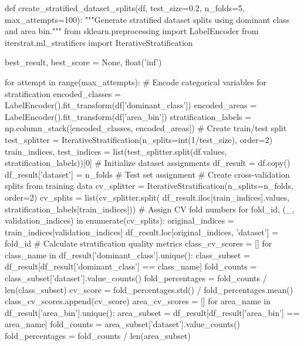 \newpage
\begin{code}[H]
    \begin{pythoncode}
    def create_stratified_dataset_splits(df, test_size=0.2, n_folds=5, max_attempts=100):
        """Generate stratified dataset splits using dominant class and area bin."""
        from sklearn.preprocessing import LabelEncoder
        from iterstrat.ml_stratifiers import IterativeStratification
        
        best_result, best_score = None, float('inf')
        
        for attempt in range(max_attempts):
            # Encode categorical variables for stratification
            encoded_classes = LabelEncoder().fit_transform(df['dominant_class'])
            encoded_areas = LabelEncoder().fit_transform(df['area_bin'])
            stratification_labels = np.column_stack([encoded_classes, encoded_areas])
            # Create train/test split
            test_splitter = IterativeStratification(n_splits=int(1/test_size), order=2)
            train_indices, test_indices = list(test_splitter.split(df.values, stratification_labels))[0]
            # Initialize dataset assignments
            df_result = df.copy()
            df_result['dataset'] = n_folds  # Test set assignment
            # Create cross-validation splits from training data
            cv_splitter = IterativeStratification(n_splits=n_folds, order=2)
            cv_splits = list(cv_splitter.split(
                df_result.iloc[train_indices].values, 
                stratification_labels[train_indices]))
            # Assign CV fold numbers
            for fold_id, (_, validation_indices) in enumerate(cv_splits):
                original_indices = train_indices[validation_indices]
                df_result.loc[original_indices, 'dataset'] = fold_id
            # Calculate stratification quality metrics
            class_cv_scores = []
            for class_name in df_result['dominant_class'].unique():
                class_subset = df_result[df_result['dominant_class'] == class_name]
                fold_counts = class_subset['dataset'].value_counts()
                fold_percentages = fold_counts / len(class_subset)
                cv_score = fold_percentages.std() / fold_percentages.mean()
                class_cv_scores.append(cv_score)
            area_cv_scores = []
            for area_name in df_result['area_bin'].unique():
                area_subset = df_result[df_result['area_bin'] == area_name]
                fold_counts = area_subset['dataset'].value_counts()
                fold_percentages = fold_counts / len(area_subset)

\end{pythoncode}
\end{code}
